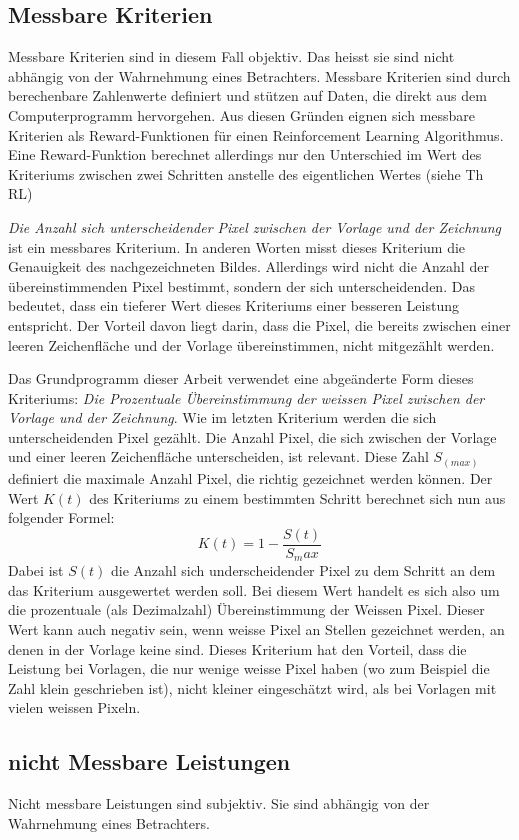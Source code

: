 \subsection*{Messbare Kriterien}
Messbare Kriterien sind in diesem Fall objektiv. Das heisst sie sind nicht
abhängig von der Wahrnehmung eines Betrachters. Messbare Kriterien sind durch
berechenbare Zahlenwerte definiert und stützen auf Daten, die direkt aus dem
Computerprogramm hervorgehen. Aus diesen Gründen eignen sich messbare Kriterien
als Reward-Funktionen für einen Reinforcement Learning Algorithmus. Eine
Reward-Funktion berechnet allerdings nur den Unterschied im Wert des Kriteriums
zwischen zwei Schritten anstelle des eigentlichen Wertes (siehe Th RL)

\emph{Die Anzahl sich unterscheidender Pixel zwischen der Vorlage und der Zeichnung}
ist ein messbares Kriterium. In anderen Worten misst dieses Kriterium die
Genauigkeit des nachgezeichneten Bildes. Allerdings wird nicht die Anzahl der
übereinstimmenden Pixel bestimmt, sondern der sich unterscheidenden. Das
bedeutet, dass ein tieferer Wert dieses Kriteriums einer besseren Leistung
entspricht. Der Vorteil davon liegt darin, dass die Pixel, die bereits zwischen
einer leeren Zeichenfläche und der Vorlage übereinstimmen, nicht mitgezählt
werden.

Das Grundprogramm dieser Arbeit verwendet eine abgeänderte Form dieses
Kriteriums: \emph{Die Prozentuale Übereinstimmung der weissen Pixel zwischen der Vorlage
und der Zeichnung}. Wie im letzten Kriterium werden die sich unterscheidenden
Pixel gezählt. Die Anzahl Pixel, die sich zwischen der
Vorlage und einer leeren Zeichenfläche unterscheiden, ist relevant. Diese Zahl
$S_(max)$ definiert die maximale Anzahl Pixel, die richtig gezeichnet werden
können. Der Wert $K(t)$ des Kriteriums zu einem bestimmten Schritt berechnet
sich nun aus folgender Formel: 
$$ K(t) = 1 - \frac{S(t)}{S_max} $$ Dabei ist $S(t)$ die Anzahl sich
underscheidender Pixel zu dem Schritt an dem das Kriterium ausgewertet werden
soll. Bei diesem Wert handelt es sich also um die prozentuale (als Dezimalzahl)
Übereinstimmung der Weissen Pixel. Dieser Wert kann auch negativ sein, wenn
weisse Pixel an Stellen gezeichnet werden, an denen in der Vorlage keine sind.
Dieses Kriterium hat den Vorteil, dass die Leistung bei Vorlagen, die nur wenige
weisse Pixel haben (wo zum Beispiel die Zahl klein geschrieben ist), nicht
kleiner eingeschätzt wird, als bei Vorlagen mit vielen weissen Pixeln.
    

\subsection*{nicht Messbare Leistungen}
Nicht messbare Leistungen sind subjektiv. Sie sind abhängig von der Wahrnehmung eines Betrachters.





